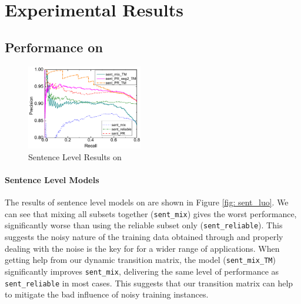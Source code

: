 \section{Experimental Results \label{sec:evaluation}}




\subsection{Performance on \TimeRE} \label{sec:results_in_TimeRE}
\begin{figure}[t!]
\setlength{\belowcaptionskip}{-10pt}
\begin{center}
\includegraphics[width=0.45\textwidth]{figures/sent_time_exp_overall.pdf}
\caption{Sentence Level Results on \TimeRE}
\label{fig: sent_luo}
\end{center}
\end{figure}

\paragraph{Sentence Level Models}
The results of sentence level models on \TimeRE are shown in Figure \ref{fig:
sent_luo}. We can see that mixing all subsets together (\texttt{sent\_mix})
gives the worst performance,  significantly
worse than using the reliable subset only (\texttt{sent\_reliable}). This
suggests the noisy nature of the training data obtained through \DS and
properly dealing with the noise is the key for \DS for a wider range of applications. %
When getting help from our dynamic transition matrix, %
the model (\texttt{sent\_mix\_TM}) significantly improves \texttt{sent\_mix},
delivering the same level of performance as \texttt{sent\_reliable} in most
cases. This suggests that our transition matrix can help to mitigate the bad influence of noisy training instances.


